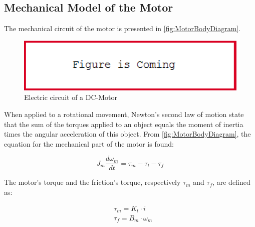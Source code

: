 \subsection*{Mechanical Model of the Motor}
The mechanical circuit of the motor is presented in \autoref{fig:MotorBodyDiagram}.

\begin{figure}[htbp]
	\centering
 	\includegraphics[width=1\textwidth]{figures/FigureIsComing.PNG} 
 	\caption{Electric circuit of a DC-Motor}
 	\label{fig:MotorBodyDiagram}
\end{figure}

When applied to a rotational movement, Newton's second law of motion state that the sum of the torques applied to an object equals the moment of inertia times the angular acceleration of this object. From \autoref{fig:MotorBodyDiagram}, the equation for the mechanical part of the motor is found:

\begin{equation}
	J_{m} \frac{d\omega_{m}}{dt} = \tau_{m} - \tau_{l} - \tau_f
	\label{eq:MotorMechanical}
\end{equation}

\startexplain
\stopexplain

The motor's torque and the friction's torque, respectively $\tau_m$ and $\tau_f$, are defined as:

\begin{subequations}
	\begin{flalign}
		&\tau_m = K_t \cdot i \label{eq:MotorTorque}\\	
		&\tau_f = B_{m}\cdot\omega_{m}	\label{eq:FrictionTorque}
	\end{flalign}
\end{subequations}

\startexplain
\stopexplain

